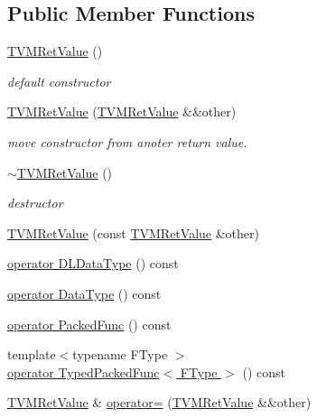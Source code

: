 \subsection*{Public Member Functions}
\begin{DoxyCompactItemize}
\item 
\hyperlink{classtvm_1_1runtime_1_1TVMRetValue_a77455a8fe7d27b90a01a64f1cd28e9ec}{T\+V\+M\+Ret\+Value} ()
\begin{DoxyCompactList}\small\item\em default constructor \end{DoxyCompactList}\item 
\hyperlink{classtvm_1_1runtime_1_1TVMRetValue_ac4a3850c0989e7c2d5cd8e0f096d0997}{T\+V\+M\+Ret\+Value} (\hyperlink{classtvm_1_1runtime_1_1TVMRetValue}{T\+V\+M\+Ret\+Value} \&\&other)
\begin{DoxyCompactList}\small\item\em move constructor from anoter return value. \end{DoxyCompactList}\item 
\hyperlink{classtvm_1_1runtime_1_1TVMRetValue_a0eeb2af3fa21cebfdc2bcf04b2fbb1f6}{$\sim$\+T\+V\+M\+Ret\+Value} ()
\begin{DoxyCompactList}\small\item\em destructor \end{DoxyCompactList}\item 
\hyperlink{classtvm_1_1runtime_1_1TVMRetValue_ab86bf21f214fca72e73a7f6e20ffab8d}{T\+V\+M\+Ret\+Value} (const \hyperlink{classtvm_1_1runtime_1_1TVMRetValue}{T\+V\+M\+Ret\+Value} \&other)
\item 
\hyperlink{classtvm_1_1runtime_1_1TVMRetValue_ac4320260c25f8ab0ff3d5a5795a6efa4}{operator D\+L\+Data\+Type} () const 
\item 
\hyperlink{classtvm_1_1runtime_1_1TVMRetValue_ad97cce376415a77a51215c9539732a75}{operator Data\+Type} () const 
\item 
\hyperlink{classtvm_1_1runtime_1_1TVMRetValue_a97e114bab413908227041ae324367c6f}{operator Packed\+Func} () const 
\item 
{\footnotesize template$<$typename F\+Type $>$ }\\\hyperlink{classtvm_1_1runtime_1_1TVMRetValue_a8aee084bb1fbda132f8bc78353d3fa55}{operator Typed\+Packed\+Func$<$ F\+Type $>$} () const 
\item 
\hyperlink{classtvm_1_1runtime_1_1TVMRetValue}{T\+V\+M\+Ret\+Value} \& \hyperlink{classtvm_1_1runtime_1_1TVMRetValue_a4993d4b338c28096b56ed3d0d9ae5170}{operator=} (\hyperlink{classtvm_1_1runtime_1_1TVMRetValue}{T\+V\+M\+Ret\+Value} \&\&other)

\end{DoxyCompactItemize}
